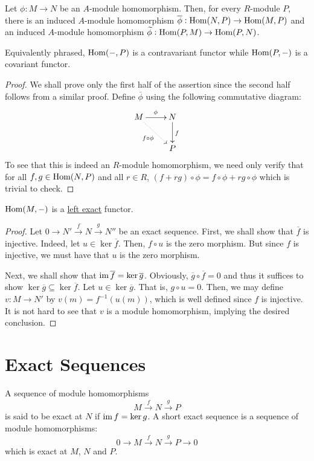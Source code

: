 \begin{theorem}
    Let $\phi: M\to N$ be an $A$-module homomorphism. Then, for every $R$-module $P$, there is an induced $A$-module homomorphism $\overline\phi:\operatorname{Hom}(N,P)\to\operatorname{Hom}(M,P)$ and an induced $A$-module homomorphism $\widetilde\phi:\operatorname{Hom}(P,M)\to\operatorname{Hom}(P,N)$. 
    
    Equivalently phrased, $\operatorname{Hom}(-,P)$ is a contravariant functor while $\operatorname{Hom}(P,-)$ is a covariant functor.
\end{theorem}
\begin{proof}
    We shall prove only the first half of the assertion since the second half follows from a similar proof. Define $\overline\phi$ using the following commutative diagram: 
    \begin{equation*}
    \xymatrix {
        M\ar[r]^{\phi}\ar@{.>}[rd]_{f\circ\phi} & N\ar[d]^f\\
        & P
    }
    \end{equation*}
    To see that this is indeed an $R$-module homomorphism, we need only verify that for all $f,g\in\operatorname{Hom}(N,P)$ and all $r\in R$, $(f + rg)\circ\phi = f\circ\phi + rg\circ\phi$ which is trivial to check.
\end{proof}

\begin{theorem}
    $\operatorname{Hom}(M,-)$ is a \underline{left exact} functor.
\end{theorem}
\begin{proof}
    Let $0\rightarrow N'\stackrel f\rightarrow N\stackrel g\rightarrow N''$ be an exact sequence. First, we shall show that $\overline f$ is injective. Indeed, let $u\in\ker\overline f$. Then, $f\circ u$ is the zero morphism. But since $f$ is injective, we must have that $u$ is the zero morphism.

    Next, we shall show that $\operatorname{im}\overline f = \ker\overline g$. Obviously, $\overline g\circ\overline f = 0$ and thus it suffices to show $\ker\overline g\subseteq\ker\overline f$. Let $u\in\ker\overline g$. That is, $g\circ u = 0$. Then, we may define $v: M\to N'$ by $v(m) = f^{-1}(u(m))$, which is well defined since $f$ is injective. It is not hard to see that $v$ is a module homomorphism, implying the desired conclusion.
\end{proof}

\section{Exact Sequences}

\begin{definition}
    A sequence of module homomorphisms 
    \begin{equation*}
        M\stackrel{f}{\longrightarrow} N\stackrel{g}{\longrightarrow}P
    \end{equation*}
    is said to be exact at $N$ if $\operatorname{im} f = \ker g$. A short exact sequence is a sequence of module homomorphisms: 
    \begin{equation*}
        0\longrightarrow M\stackrel{f}{\longrightarrow} N\stackrel{g}{\longrightarrow} P\longrightarrow 0
    \end{equation*}
    which is exact at $M$, $N$ and $P$.
\end{definition}

